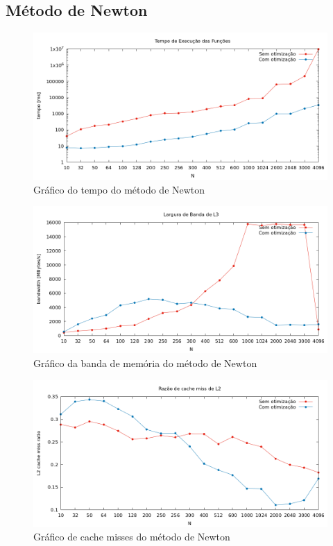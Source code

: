 \documentclass{article}
\begin{document}
\newpage
\subsection{Método de Newton}

\begin{figure}[htp]
    \centering
    \includegraphics[width=12cm]{tempo_newton.png}
    \caption{Gráfico do tempo do método de Newton}
    \label{fig:tempo_newton}
\end{figure}

\begin{figure}[htp]
    \centering
    \includegraphics[width=12cm]{l3_newton.png}
    \caption{Gráfico da banda de memória do método de Newton}
    \label{fig:l3_newton}
\end{figure}

\begin{figure}[htp]
    \centering
    \includegraphics[width=12cm]{l2cache_newton.png}
    \caption{Gráfico de cache misses do método de Newton}
    \label{fig:l2_newton}
\end{figure}
\end{document}

